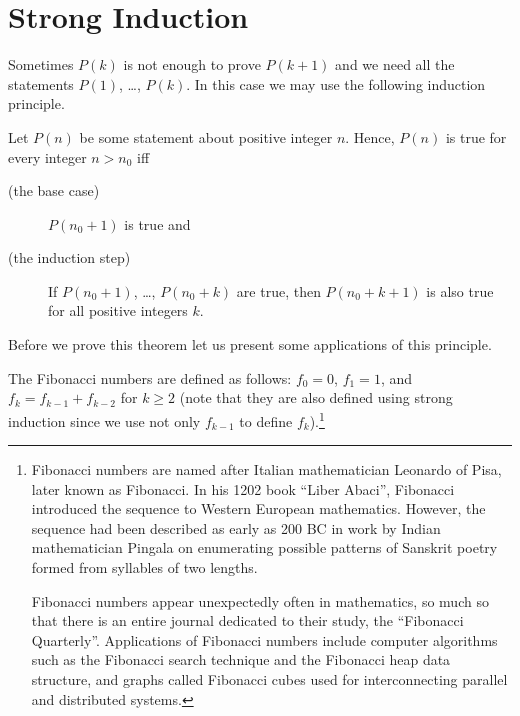\chapter{Strong Induction}
Sometimes $P(k)$ is not enough to prove $P(k + 1)$ and we need all the
statements $P(1)$, \dots, $P(k)$. In this case we may use the following
induction  principle.

\begin{theorem}
\label{theorem:strong-induction}
    Let $P(n)$ be some statement about positive integer $n$.
    Hence, $P(n)$ is true for every integer $n > n_0$ iff
    \begin{description}
        \item [(the base case)] $P(n_0 + 1)$ is true and
        \item [(the induction step)] If $P(n_0 + 1)$, \dots, $P(n_0 + k)$ are true,
            then $P(n_0 + k + 1)$ is also true for all positive integers $k$.
  \end{description}
\end{theorem}

Before we prove this theorem let us present some applications of this
principle.

The Fibonacci numbers are defined as follows:
$f_0 = 0$, $f_1 = 1$, and $f_k = f_{k - 1} + f_{k - 2}$ for $k \ge 2$ (note
that they are also defined using strong induction since we use not only
$f_{k - 1}$ to define $f_k$).\footnote{%
  Fibonacci numbers are named after Italian mathematician Leonardo of Pisa,
  later known as Fibonacci. In his 1202 book ``Liber Abaci'', Fibonacci
  introduced the sequence to Western European mathematics. However, the sequence
  had been described as early as 200 BC in work by Indian mathematician Pingala
  on enumerating possible patterns of Sanskrit poetry formed from syllables of
  two lengths.
  
  Fibonacci numbers appear unexpectedly often in mathematics, so much so that
  there is an entire journal dedicated to their study, the ``Fibonacci
  Quarterly''. Applications of Fibonacci numbers include computer algorithms
  such as the Fibonacci search technique and the Fibonacci heap data structure,
  and graphs called Fibonacci cubes used for interconnecting parallel and
  distributed systems.
}

